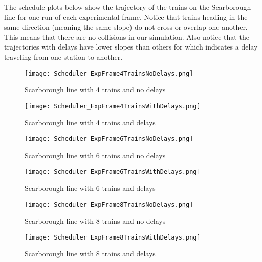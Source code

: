 The schedule plots below show the trajectory of the trains on the Scarborough
line for one run of each experimental frame. Notice that trains heading in the same direction (meaning the same slope) do not cross or overlap one another. This means that there are no collisions in our simulation. Also notice
that the trajectories with delays have lower slopes than others for which
indicates a delay traveling from one station to another.

\begin{figure}[tb]
	\centering
	\texttt{[image: Scheduler\_ExpFrame4TrainsNoDelays.png]}
	\caption{Scarborough line with 4 trains and no delays}\label{fig:4trainsNoDelay}
\end{figure}

\begin{figure}[tb]
	\centering
	\texttt{[image: Scheduler\_ExpFrame4TrainsWithDelays.png]}
	\caption{Scarborough line with 4 trains and delays}\label{fig:4trainsWithDelay}
\end{figure}

\begin{figure}[tb]
	\centering
	\texttt{[image: Scheduler\_ExpFrame6TrainsNoDelays.png]}
	\caption{Scarborough line with 6 trains and no delays}\label{fig:6trainsNoDelay}
\end{figure}

\begin{figure}[tb]
	\centering
	\texttt{[image: Scheduler\_ExpFrame6TrainsWithDelays.png]}
	\caption{Scarborough line with 6 trains and delays}\label{fig:6trainsWithDelay}
\end{figure}

\begin{figure}[tb]
	\centering
	\texttt{[image: Scheduler\_ExpFrame8TrainsNoDelays.png]}
	\caption{Scarborough line with 8 trains and no delays}\label{fig:8trainsNoDelay}
\end{figure}

\begin{figure}[tb]
	\centering
	\texttt{[image: Scheduler\_ExpFrame8TrainsWithDelays.png]}
	\caption{Scarborough line with 8 trains and delays}\label{fig:8trainsWithDelay}
\end{figure}